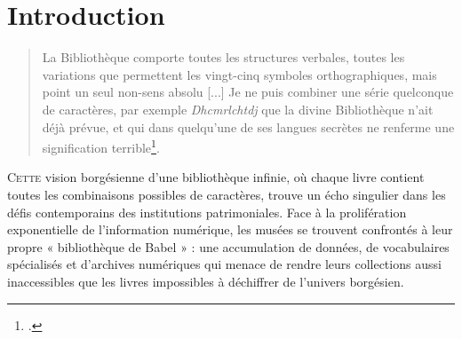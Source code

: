 \chapter{Introduction}	

\begin{quote}
    \og La Bibliothèque comporte toutes les structures verbales, toutes les variations que permettent les vingt-cinq symboles orthographiques, mais point un seul non-sens absolu [...] Je ne puis combiner une série quelconque de caractères, par exemple	\textit{Dhcmrlchtdj} que la divine Bibliothèque n’ait déjà prévue, et qui dans quelqu'une de ses langues secrètes ne renferme
	une signification terrible\footcite{borgesBibliothequeBabel1990}.\fg
\end{quote}	
	

	




\lettrine{C}{ette} vision borgésienne d'une bibliothèque infinie, où chaque livre contient toutes les combinaisons possibles de caractères, trouve un écho singulier dans les défis contemporains des institutions patrimoniales. Face à la prolifération exponentielle de l'information numérique, les musées se trouvent confrontés à leur propre « bibliothèque de Babel » : une accumulation de données, de vocabulaires spécialisés et d'archives numériques qui menace de rendre leurs collections aussi inaccessibles que les livres impossibles à déchiffrer de l'univers borgésien.

